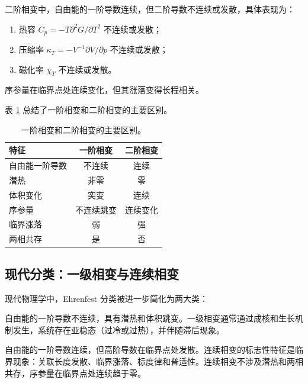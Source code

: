 \begin{property}[二阶相变的特征]
二阶相变中，自由能的一阶导数连续，但二阶导数不连续或发散，具体表现为：
\begin{enumerate}
    \item 热容 $C_p = -T \partial^2 G/\partial T^2$ 不连续或发散；
    \item 压缩率 $\kappa_T = -V^{-1} \partial V/\partial p$ 不连续或发散；
    \item 磁化率 $\chi_T$ 不连续或发散。
\end{enumerate}
序参量在临界点处连续变化，但其涨落变得长程相关。
\end{property}

表 \ref{tab:phase_transition_comparison} 总结了一阶相变和二阶相变的主要区别。

\begin{table}[htbp]
\centering
\begin{tabular}{|l|c|c|}
\hline
\textbf{特征} & \textbf{一阶相变} & \textbf{二阶相变} \\
\hline
自由能一阶导数 & 不连续 & 连续 \\
\hline
潜热 & 非零 & 零 \\
\hline
体积变化 & 突变 & 连续 \\
\hline
序参量 & 不连续跳变 & 连续变化 \\
\hline
临界涨落 & 弱 & 强 \\
\hline
两相共存 & 是 & 否 \\
\hline
\end{tabular}
\caption{一阶相变和二阶相变的主要区别。}
\label{tab:phase_transition_comparison}
\end{table}

\subsection{现代分类：一级相变与连续相变}

现代物理学中，Ehrenfest 分类被进一步简化为两大类：

\begin{definition}[一级相变]
自由能的一阶导数不连续，具有潜热和体积跳变。一级相变通常通过成核和生长机制发生，系统存在亚稳态（过冷或过热），并伴随滞后现象。
\end{definition}

\begin{definition}[连续相变]
自由能的一阶导数连续，但高阶导数在临界点处发散。连续相变的标志性特征是临界现象：关联长度发散、临界涨落、标度律和普适性。连续相变不涉及潜热和两相共存，序参量在临界点处连续趋于零。
\end{definition}

